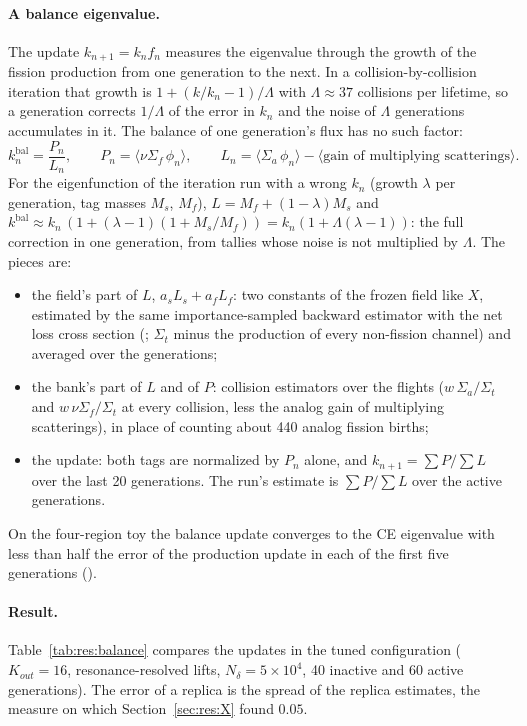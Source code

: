 \paragraph{A balance eigenvalue.} The update $k_{n+1}=k_nf_n$ measures the eigenvalue through the
growth of the fission production from one generation to the next. In a collision-by-collision
iteration that growth is $1+(k/k_n-1)/\Lambda$ with $\Lambda\approx37$ collisions per lifetime, so a
generation corrects $1/\Lambda$ of the error in $k_n$ and the noise of $\Lambda$ generations
accumulates in it. The balance of one generation's flux has no such factor:
\begin{equation}
k^{\text{bal}}_n=\frac{P_n}{L_n},\qquad
P_n=\langle\nu\Sigma_f\,\phi_n\rangle,\qquad
L_n=\langle\Sigma_a\,\phi_n\rangle-\langle\text{gain of multiplying scatterings}\rangle .
\end{equation}
For the eigenfunction of the iteration run with a wrong $k_n$ (growth $\lambda$ per generation, tag
masses $M_s$, $M_f$), $L=M_f+(1-\lambda)M_s$ and
$k^{\text{bal}}\approx k_n\,(1+(\lambda-1)(1+M_s/M_f))=k_n(1+\Lambda(\lambda-1))$: the full correction
in one generation, from tallies whose noise is not multiplied by $\Lambda$. The pieces are:
\begin{itemize}
\item the field's part of $L$, $a_sL_s+a_fL_f$: two constants of the frozen field like $X$,
  estimated by the same importance-sampled backward estimator with the net loss cross section
  (; $\Sigma_t$ minus the production of every non-fission
  channel) and averaged over the generations;
\item the bank's part of $L$ and of $P$: collision estimators over the flights
  ($w\,\Sigma_a/\Sigma_t$ and $w\,\nu\Sigma_f/\Sigma_t$ at every collision, less the analog gain of
  multiplying scatterings), in place of counting about 440 analog fission births;
\item the update: both tags are normalized by $P_n$ alone, and
  $k_{n+1}=\sum P/\sum L$ over the last 20 generations. The run's estimate is $\sum P/\sum L$ over
  the active generations.
\end{itemize}
On the four-region toy the balance update converges to the CE eigenvalue with less than half the
error of the production update in each of the first five generations ().

\paragraph{Result.} Table~\ref{tab:res:balance} compares the updates in the tuned configuration
($K_{out}=16$, resonance-resolved lifts, $N_\delta=5\times10^4$, 40 inactive and 60 active
generations). The error of a replica is the spread of the replica estimates, the measure on which
Section~\ref{sec:res:X} found $0.05$.

